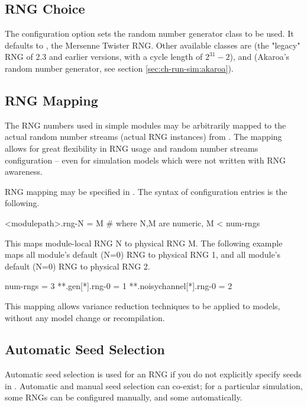 \subsection{RNG Choice}

The  configuration option sets the random number
generator class to be used. It defaults to ,
the Mersenne Twister RNG. Other available classes are 
(the "legacy" RNG of {\opp} 2.3 and earlier versions, with a cycle length
of $2^{31}-2$), and  (Akaroa's random number generator,
see section \ref{sec:ch-run-sim:akaroa}).

\subsection{RNG Mapping}

The RNG numbers used in simple modules may be arbitrarily mapped to the
actual random number streams (actual RNG instances) from .
The mapping allows for great flexibility in RNG usage and random number
streams configuration -- even for simulation models which were not
written with RNG awareness.

RNG mapping may be specified in . The syntax of
configuration entries is the following.

\begin{inifile}
[General]
<modulepath>.rng-N = M  # where N,M are numeric, M < num-rngs
\end{inifile}

This maps module-local RNG N to physical RNG M. The following
example maps all  module's default (N=0) RNG to physical RNG 1,
and all  module's default (N=0) RNG to physical RNG 2.

\begin{inifile}
[General]
num-rngs = 3
**.gen[*].rng-0 = 1
**.noisychannel[*].rng-0 = 2
\end{inifile}

This mapping allows variance reduction techniques to be applied to
{\opp} models, without any model change or recompilation.


\subsection{Automatic Seed Selection}

Automatic seed selection is used for an RNG if you do not explicitly
specify seeds in . Automatic and manual seed selection can
co-exist; for a particular simulation, some RNGs can be configured
manually, and some automatically.

